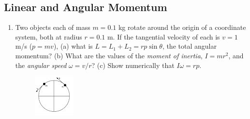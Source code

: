 \documentclass[10pt]{article}
\begin{document}
\subsection{Linear and Angular Momentum}
\begin{enumerate}
\item Two objects each of mass $m = 0.1$ kg rotate around the origin of a coordinate system, both at radius $r = 0.1$ m.  If the tangential velocity of each is $v = 1$ m/s ($p = mv$), (a) what is $L = L_1 + L_2 = rp\sin\theta$, the total angular momentum?  (b) What are the values of the \textit{moment of inertia}, $I = mr^2$, and the \textit{angular speed} $\omega = v/r$?  (c) Show numerically that $I\omega = rp$.
\begin{figure}[hb]
\centering
\includegraphics[width=0.2\textwidth]{rotate.pdf}
\end{figure}
\end{enumerate}
\end{document}
